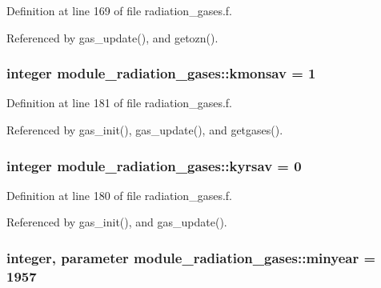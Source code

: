 Definition at line 169 of file radiation\+\_\+gases.\+f.



Referenced by gas\+\_\+update(), and getozn().

\subsubsection[{\texorpdfstring{kmonsav}{kmonsav}}]{\setlength{\rightskip}{0pt plus 5cm}integer module\+\_\+radiation\+\_\+gases\+::kmonsav = 1\hspace{0.3cm}{\ttfamily [private]}}\hypertarget{namespacemodule__radiation__gases_ab1cf1b63398a3e7ec0334a7c97258b4d}{}\label{namespacemodule__radiation__gases_ab1cf1b63398a3e7ec0334a7c97258b4d}


Definition at line 181 of file radiation\+\_\+gases.\+f.



Referenced by gas\+\_\+init(), gas\+\_\+update(), and getgases().

\subsubsection[{\texorpdfstring{kyrsav}{kyrsav}}]{\setlength{\rightskip}{0pt plus 5cm}integer module\+\_\+radiation\+\_\+gases\+::kyrsav = 0\hspace{0.3cm}{\ttfamily [private]}}\hypertarget{namespacemodule__radiation__gases_a6b4372e633bef3fb367e6ff3cf200bb8}{}\label{namespacemodule__radiation__gases_a6b4372e633bef3fb367e6ff3cf200bb8}


Definition at line 180 of file radiation\+\_\+gases.\+f.



Referenced by gas\+\_\+init(), and gas\+\_\+update().

\subsubsection[{\texorpdfstring{minyear}{minyear}}]{\setlength{\rightskip}{0pt plus 5cm}integer, parameter module\+\_\+radiation\+\_\+gases\+::minyear = 1957\hspace{0.3cm}{\ttfamily [private]}}\hypertarget{namespacemodule__radiation__gases_a3b26af64187b57999cadeced419b0f1b}{}\label{namespacemodule__radiation__gases_a3b26af64187b57999cadeced419b0f1b}


